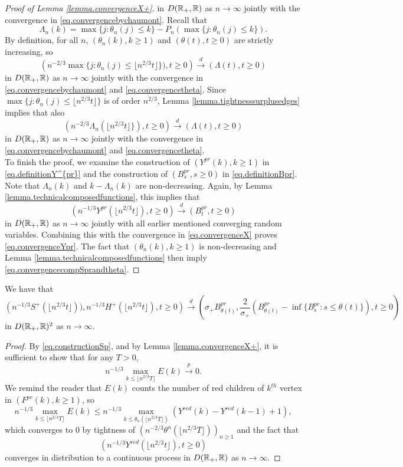 \begin{proof}[Proof of Lemma \ref{lemma.convergenceX+}]
  in $D({\mathbb R}_+,{\mathbb R})$ as $n\to \infty$ jointly with the convergence in \eqref{eq.convergencebychaumont}.
Recall that 
$$\Lambda_n(k)=\max\{j:\theta_n(j)\leq k\}-P_n(\max\{j:\theta_n(j)\leq k\}). $$ By definition, for all $n$, $(\theta_n(k),k\geq 1)$ and $(\theta(t),t\geq 0)$ are strictly increasing, so
$$\left(n^{-2/3}\max\{j:\theta_n(j)\leq \lfloor n^{2/3} t \rfloor\} ),t\geq 0\right)\overset{d}{\to}\left( \Lambda(t),t\geq0 \right)$$
in $D({\mathbb R}_+,{\mathbb R})$ as $n\to \infty$ jointly with the convergence in \eqref{eq.convergencebychaumont} and \eqref{eq.convergencetheta}. Since $\max\{j:\theta_n(j)\leq \lfloor n^{2/3} t \rfloor\}$ is of order $n^{2/3}$, Lemma \ref{lemma.tightnesssurplusedges} implies that also 
$$\left(n^{-2/3}\Lambda_n\left(\lfloor n^{2/3} t \rfloor\} \right),t\geq 0\right)\overset{d}{\to}\left( \Lambda(t),t\geq0 \right)$$
in $D({\mathbb R}_+,{\mathbb R})$ as $n\to \infty$ jointly with the convergence in \eqref{eq.convergencebychaumont} and \eqref{eq.convergencetheta}.\\
To finish the proof, we examine the construction of $(Y^{pr}(k),k\geq 1)$ in \eqref{eq.definitionY^{pr}} and the construction of $(B^{pr}_s,s\geq 0)$ in \eqref{eq.definitionBpr}. 
Note that $\Lambda_n(k)$ and $k-\Lambda_n(k)$ are non-decreasing. Again, by Lemma \ref{lemma.technicalcomposedfunctions}, this implies that 
$$\left(n^{-1/3}Y^{pr}\left( \lfloor n^{2/3} t \rfloor \right), t\geq 0 \right)\overset{d}{\to} \left( B^{pr}_{t}, t\geq 0\right)$$
in $D({\mathbb R}_+,{\mathbb R})$ as $n\to \infty$ jointly with all earlier mentioned converging random variables. Combining this with the convergence in \eqref{eq.convergenceX} proves \eqref{eq.convergenceYpr}. The fact that $(\theta_n(k),k\geq 1)$ is non-decreasing and Lemma \ref{lemma.technicalcomposedfunctions} then imply \eqref{eq.convergencecompSprandtheta}. 
\end{proof}

\begin{lemma}\label{lemma.subtracterrorconverges}
We have that 
$$\left(n^{-1/3}S^{+}\left(\lfloor n^{2/3}t\rfloor \right)), n^{-1/3}H^{+}\left(\lfloor n^{2/3}t\rfloor \right) ,t\geq 0 \right) \overset{d}{\to} \left(\sigma_+ B^{pr}_{\theta (t)},\frac{2}{\sigma_+} \left(B^{pr}_{\theta (t)}-\inf\{B^{pr}_{s}:s\leq \theta(t)\}\right) ,t\geq 0 \right)$$
in $D({\mathbb R}_+,{\mathbb R})^2$ as $n\to \infty$. 
\end{lemma}


\begin{proof}
By \eqref{eq.constructionSp}, and by Lemma \ref{lemma.convergenceX+}, it is sufficient to show that for any $T>0$,
$$n^{-1/3}\max_{k\leq \lfloor n^{2/3}T\rfloor}E(k)\overset{p}{\to}0.$$
We remind the reader that $E(k)$ counts the number of red children of $k^{th}$ vertex in $(F^{pr}(k),k\geq 1)$, so
$$n^{-1/3}\max_{k\leq \lfloor n^{2/3}T\rfloor}E(k)\leq n^{-1/3}\max_{k\leq \theta_n(\lfloor n^{2/3}T\rfloor)}(Y^{red}(k)-Y^{red}(k-1)+1),$$
which converges to $0$ by tightness of $\left(n^{-2/3}\theta^{n}(\lfloor n^{2/3}T\rfloor)\right)_{n\geq 1}$ and the fact that $$\left(n^{-1/3}Y^{red}\left(\lfloor n^{2/3}t\rfloor\right),t\geq 0\right)$$ converges in distribution to a continuous process in $D({\mathbb R}_+,{\mathbb R})$ as $n\to\infty$.
\end{proof}

